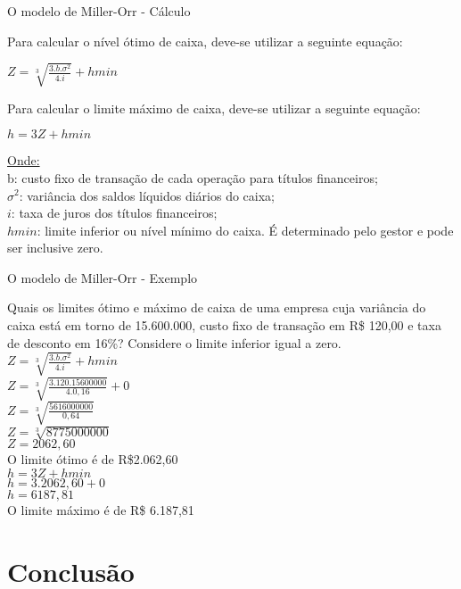 \documentclass[10pt]{beamer}
\begin{document}
\begin{frame}[fragile]{O modelo de Miller-Orr - Cálculo}

Para calcular o nível ótimo de caixa, deve-se utilizar a seguinte equação:\\
\begin{center}
$ Z = \sqrt[3]{\frac{3.b.\sigma ^{2}}{4.i}}+hmin$ \\
\end{center}
Para calcular o limite máximo de caixa, deve-se utilizar a seguinte equação:
\begin{center}
$h = 3Z + hmin$\\
\end{center}
\scriptsize \underline{Onde:}\\ 
b: custo fixo de transação de cada operação para títulos financeiros;\\
$\sigma ^{2}$: variância dos saldos líquidos diários do caixa;\\
$i$: taxa de juros dos títulos financeiros;\\
$hmin$: limite inferior ou nível mínimo do caixa. É determinado pelo gestor e pode ser inclusive zero.\\

\end{frame}

\begin{frame}[fragile]{O modelo de Miller-Orr - Exemplo}

Quais os limites ótimo e máximo de caixa de uma empresa cuja variância do caixa está em torno de 15.600.000, custo fixo de transação em R\$ 120,00 e taxa de desconto em 16\%? Considere o limite inferior igual a zero.  \\
$ Z = \sqrt[3]{\frac{3.b.\sigma ^{2}}{4.i}}+hmin$ \\
$ Z = \sqrt[3]{\frac{3.120.15600000}{4.0,16}}+0$ \\
$ Z = \sqrt[3]{\frac{5616000000}{0,64}}$ \\
$ Z = \sqrt[3]{8775000000}$ \\
$ Z = 2062,60$\\
O limite ótimo é de R\$2.062,60\\
$h = 3Z + hmin$\\
$h = 3.2062,60 + 0$\\
$h = 6187,81$\\
O limite máximo é de R\$ 6.187,81
\end{frame}



\section{Conclusão}
\end{document}

